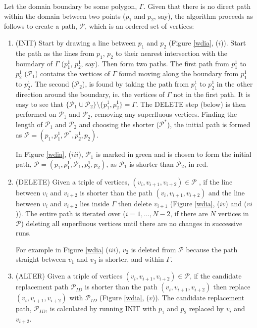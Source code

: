 \documentclass{article}
\begin{document}
Let the domain boundary be some polygon, $\Gamma$. Given that there is no direct path within the domain between two points ($p_1$ and $p_2$, say), the algorithm proceeds as follows to create a path, $\mathcal{P}$, which is an ordered set of vertices:
\begin{enumerate}
\item (INIT) Start by drawing a line between $p_1$ and $p_2$ (Figure \ref{wdia}, ($i$)). Start the path as the lines from $p_1$, $p_2$ to their nearest intersection with the boundary of $\Gamma$ ($p_1^1$, $p_2^1$, say). Then form two paths. The first path from $p_1^1$ to $p_2^1$ ($\mathcal{P}_1$) contains the vertices of $\Gamma$ found moving along the boundary from $p_1^1$ to $p_2^1$. The second ($\mathcal{P}_2$), is found by taking the path from $p_1^1$ to $p_2^1$ in the other direction around the boundary, ie. the vertices of $\Gamma$ not in the first path. It is easy to see that $\{\mathcal{P}_1 \cup \mathcal{P}_2\} \setminus \{p_1^1, p_2^1\} = \Gamma$. The DELETE step (below) is then performed on $\mathcal{P}_1$ and $\mathcal{P}_2$, removing any superfluous vertices. Finding the length of $\mathcal{P}_1$ and $\mathcal{P}_2$ and choosing the shorter ($\mathcal{P^*}$), the initial path is formed as $\mathcal{P}=(p_1,p_1^1,\mathcal{P}^*,p_2^1,p_2)$. 

In Figure \ref{wdia}, ($iii$), $\mathcal{P}_1$ is marked in green and is chosen to form the initial path, $\mathcal{P}=(p_1,p_1^1,\mathcal{P}_1,p_2^1,p_2)$, as $\mathcal{P}_1$ is shorter than $\mathcal{P}_2$, in red.

\item (DELETE) Given a triple of vertices, $(v_i, v_{i+1}, v_{i+2}) \in \mathcal{P}$ , if the line between $v_i$ and $v_{i+2}$ is shorter than the path $(v_i, v_{i+1}, v_{i+2})$ and the line between $v_i$ and $v_{i+2}$ lies inside $\Gamma$ then delete $v_{i+1}$ (Figure \ref{wdia}, ($iv$) and ($vi$)). The entire path is iterated over ($i=1,\ldots,N-2$, if there are $N$ vertices in $\mathcal{P}$)  deleting all superfluous vertices until there are no changes in successive runs. 

For example in Figure \ref{wdia} ($iii$), $v_2$ is deleted from $\mathcal{P}$ because the path straight between $v_1$ and $v_3$ is shorter, and within $\Gamma$.

\item (ALTER) Given a triple of vertices $(v_i, v_{i+1}, v_{i+2}) \in \mathcal{P}$, if the candidate replacement path $\mathcal{P}_{ID}$ is shorter than the path $(v_i, v_{i+1}, v_{i+2})$ then replace $(v_i, v_{i+1}, v_{i+2})$ with $\mathcal{P}_{ID}$ (Figure \ref{wdia}, ($v$)). The candidate replacement path, $\mathcal{P}_{ID}$, is calculated by running INIT with $p_1$ and $p_2$ replaced by $v_i$ and $v_{i+2}$.


\end{enumerate}
\end{document}
